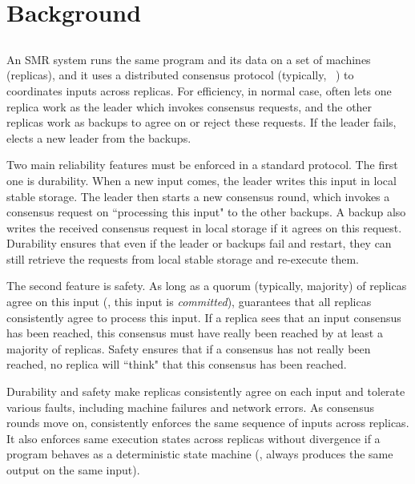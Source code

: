 \section{Background} \label{sec:background}


\subsection{\paxos}\label{sec:paxos}
An SMR system runs the same program and its data on a set of machines 
(replicas), and it uses a distributed consensus protocol (typically, 
\paxos~\cite{paxos:complex,paxos,paxos:simple,paxos:live,paxos:fast,
paxos:practical}) to coordinates inputs across replicas. For efficiency, in 
normal case, \paxos often lets one replica work as the leader which invokes 
consensus requests, and the other replicas work as backups to agree on or 
reject 
these requests. If the leader fails, \paxos elects a new leader from the 
backups.

Two main reliability features must be enforced in a standard \paxos protocol. 
The first one is durability. When a new input comes, the \paxos leader writes 
this input in local stable storage. The leader then starts a new consensus 
round, which invokes a consensus request on ``processing this input" to the 
other backups. A backup also writes the received consensus request in local 
storage if it agrees on this request. Durability ensures that even if the 
leader or backups fail and restart, they can still retrieve the requests from 
local stable storage and re-execute them.

The second feature is safety. As long as a quorum (typically, majority) of 
replicas agree on this input (\ie, this input is \emph{committed}), \paxos 
guarantees that all replicas consistently agree to process this input. If a 
replica sees that an input consensus has been reached, this consensus must have 
really been reached by at least a majority of replicas. Safety ensures that if 
a consensus has not really been reached, no replica will ``think" that this 
consensus has been reached.

Durability and safety make replicas consistently agree on each input and 
tolerate various faults, including machine failures and network errors. As 
consensus rounds move on, \paxos consistently enforces the same sequence of 
inputs across replicas. It also enforces same execution states across replicas 
without divergence if a program behaves as a deterministic state machine (\ie, 
always produces the same output on the same input).

